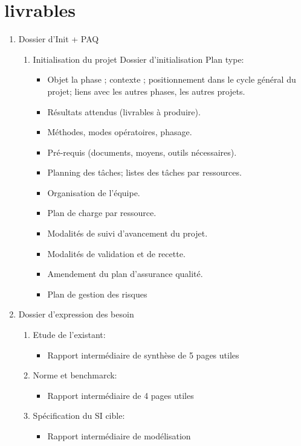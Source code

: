 \section{livrables}


\begin{enumerate}
	\item Dossier d'Init + PAQ
		\begin{enumerate}
			\item Initialisation du projet
				Dossier d'initialisation
					Plan type:
						\begin{itemize}
							\item Objet la phase ; contexte ; positionnement dans le cycle général du projet; liens avec les autres phases, les autres projets.
							\item Résultats attendus (livrables à produire).
							\item Méthodes, modes opératoires, phasage.
							\item Pré-requis (documents, moyens, outils nécessaires).
							\item Planning des tâches; listes des tâches par ressources.
							\item Organisation de l’équipe.
							\item Plan de charge par ressource.
							\item Modalités de suivi d’avancement du projet.
							\item Modalités de validation et de recette.
							\item Amendement du plan d’assurance qualité.
							\item Plan de gestion des risques
						\end{itemize}
		\end{enumerate}
	\item Dossier d'expression des besoin
		\begin{enumerate}
			\item Etude de l'existant:
				\begin{itemize}
					\item Rapport intermédiaire de synthèse de 5 pages utiles
				\end{itemize}
			\item Norme et benchmarck:
				\begin{itemize} 
					\item Rapport intermédiaire de 4 pages utiles
				\end{itemize}
			\item Spécification du SI cible:
				\begin{itemize} 
					\item Rapport intermédiaire de modélisation
				\end{itemize}
		\end{enumerate}


\end{enumerate}
